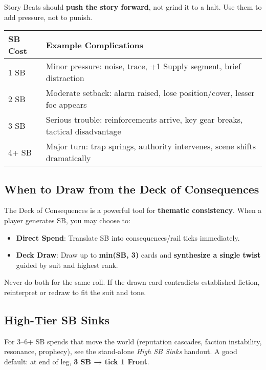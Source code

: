 Story Beats should \textbf{push the story forward}, not grind it to a halt. Use them to add pressure, not to punish.

\begin{fatebox}
\begin{tabularx}{\textwidth}{lX}
\toprule
\textbf{SB Cost} & \textbf{Example Complications} \\
\midrule
1 SB & Minor pressure: noise, trace, +1 Supply segment, brief distraction \\
2 SB & Moderate setback: alarm raised, lose position/cover, lesser foe appears \\
3 SB & Serious trouble: reinforcements arrive, key gear breaks, tactical disadvantage \\
4+ SB & Major turn: trap springs, authority intervenes, scene shifts dramatically \\
\bottomrule
\end{tabularx}
\end{fatebox}

\subsection{When to Draw from the Deck of Consequences}

The Deck of Consequences is a powerful tool for \textbf{thematic consistency}. When a player generates SB, you may choose to:

\begin{itemize}
    \item \textbf{Direct Spend}: Translate SB into consequences/rail ticks immediately.
    \item \textbf{Deck Draw}: Draw up to \textbf{min(SB, 3)} cards and \textbf{synthesize a single twist} guided by suit and highest rank.
\end{itemize}

Never do both for the same roll. If the drawn card contradicts established fiction, reinterpret or redraw to fit the suit and tone.

\subsection{High-Tier SB Sinks}
For 3--6+ SB spends that move the world (reputation cascades, faction instability, resonance, prophecy), see the stand-alone \emph{High SB Sinks} handout. A good default: at end of leg, \textbf{3 SB → tick 1 Front}.

